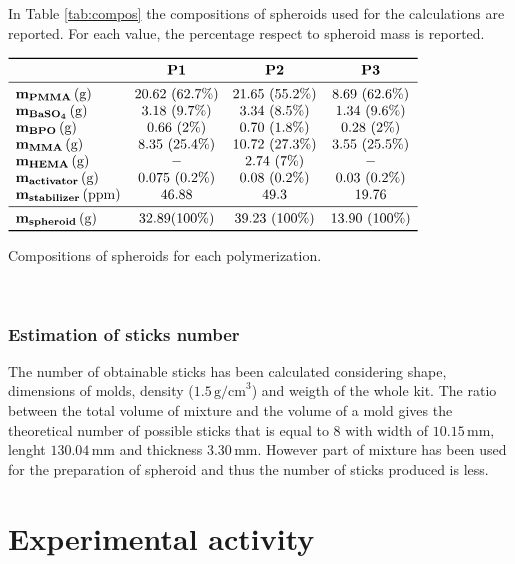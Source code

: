 \documentclass[a4paper, 11pt]{article}
\begin{document}
In Table \ref{tab:compos} the compositions of spheroids used for the calculations are reported. For each value, the percentage respect to spheroid mass is reported.
\begin{table}[htp]
\centering
$
\begin{array}{lccc}
\toprule
& \textbf{P1} & \textbf{P2} & \textbf{P3}  \\
\midrule
\mathbf{m_{PMMA}}\,(\text{g}) & 20.62\ (62.7\%) & 21.65\ (55.2\%) & 8.69\ (62.6\%) \\
\mathbf{m_{BaSO_4}}\,(\text{g}) & 3.18\ (9.7\%) & 3.34\ (8.5\%) & 1.34\ (9.6\%) \\
\mathbf{m_{BPO}}\,(\text{g}) & 0.66\ (2\%) & 0.70\ (1.8\%) & 0.28\ (2\%) \\
\mathbf{m_{MMA}}\,(\text{g}) & 8.35\ (25.4\%) & 10.72\ (27.3\%) & 3.55\ (25.5\%) \\
\mathbf{m_{HEMA}}\,(\text{g}) & - & 2.74\ (7\%) & - \\
\mathbf{m_{activator}}\,(\text{g}) & 0.075\ (0.2\%) & 0.08\ (0.2\%) & 0.03\ (0.2\%) \\
\mathbf{m_{stabilizer}}\,(\text{ppm}) & 46.88 & 49.3 & 19.76 \\
\midrule
\mathbf{m_{spheroid}}\,(\text{g}) & 32.89 (100\%) & 39.23
\ (100\%) & 13.90\ (100\%) \\
\bottomrule
\end{array}
$
\caption{Compositions of spheroids for each polymerization.}
\label{tab:compos}
\end{table}\\


\subsubsection{Estimation of sticks number}

The number of obtainable sticks has been calculated considering shape, dimensions 
of molds, density ($1.5\,\text{g/cm}^3$) and weigth of the whole kit.
The ratio between the total volume of mixture and the volume of a mold gives the theoretical number of possible sticks that is equal to 8 with width of $10.15\,\text{mm}$, lenght $130.04\,\text{mm}$ and thickness $3.30\,\text{mm}$.
However part of mixture has been used for the preparation of spheroid and thus the number of sticks produced is less.

\section{Experimental activity}
\end{document}
